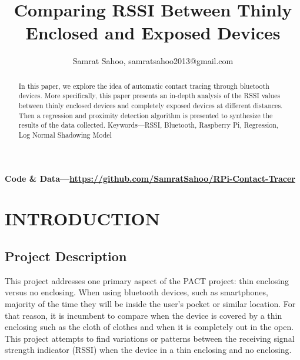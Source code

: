 \documentclass[letterpaper, 10 pt, conference]{ieeeconf}  %
\title{\LARGE \bf
Comparing RSSI Between Thinly Enclosed and Exposed Devices 
}
\author{Samrat Sahoo, samratsahoo2013@gmail.com}
\begin{document}
\maketitle
\thispagestyle{empty}
\pagestyle{empty}


\begin{abstract}

In this paper, we explore the idea of automatic contact tracing through bluetooth devices. More specifically, this paper presents an in-depth analysis of the RSSI values between thinly enclosed devices and completely exposed devices at different distances. Then a regression and proximity detection algorithm is presented to synthesize the results of the data collected.
\smallbreak
Keywords—RSSI, Bluetooth, Raspberry Pi, Regression, Log Normal Shadowing Model
\end{abstract}
\begin{Code}
\bf Code \& Data—\color{navy}\href{https://github.com/SamratSahoo/RPi-Contact-Tracer}{https://github.com/SamratSahoo/RPi-Contact-Tracer}
\end{Code}
\section{INTRODUCTION}

\subsection{Project Description}
This project addresses one primary aspect of the PACT project: thin enclosing versus no enclosing. When using bluetooth devices, such as smartphones, majority of the time they will be inside the user's pocket or similar location. For that reason, it is incumbent to compare when the device is covered by a thin enclosing such as the cloth of clothes and when it is completely out in the open. This project attempts to find variations or patterns between the receiving signal strength indicator (RSSI) when the device in a thin enclosing and no enclosing.
\end{document}
